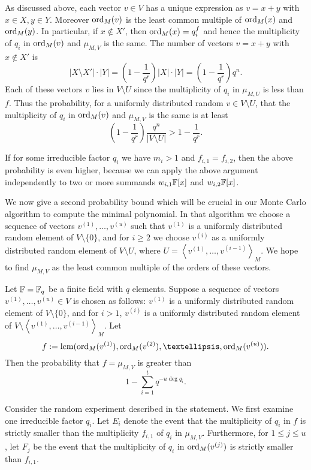 \enlargethispage{2\baselineskip}
As discussed above, each vector $v\in V$ has a 
unique expression as $v=x+y$ with $x\in X, y\in Y$. Moreover
$\mathrm{ord}_M(v)$ is the least common multiple of $\mathrm{ord}_M(x)$ and $\mathrm{ord}_M(y)$.
In particular, if $x\not\in X'$, then $\mathrm{ord}_M(x)=q_i^{f}$ and hence
the multiplicity of $q_i$ in $\mathrm{ord}_M(v)$ and $\mu_{M,V}$ is the same.
The number of vectors $v=x+y$ with $x\not\in X'$ is 
\[
|X\setminus X'|\cdot |Y|=(1-\frac{1}{q^r})|X|\cdot|Y|=(1-\frac{1}{q^r})q^n.
\]
Each of these vectors $v$ lies in $V\setminus U$ since the multiplicity of
$q_i$ in $\mu_{M,U}$ is less than $f$. Thus the probability, for
a uniformly distributed random $v\in V\setminus U$, that the multiplicity 
of $q_i$ in $\mathrm{ord}_M(v)$ and $\mu_{M,V}$ is the same is at least
\[
(1-\frac{1}{q^r})\frac{q^n}{|V\setminus U|} > 1-\frac{1}{q^r}.
\]
\proofend

\begin{Rem}
If for some irreducible factor $q_i$ we have $m_i > 1$
and $f_{i,1} = f_{i,2}$, then the above probability is even higher,
because we can apply the above argument independently to two or more summands
$w_{i,1}\mathbb{F}[x]$ and $w_{i,2}\mathbb{F}[x]$.
\end{Rem}


\smallskip
We now give a second probability bound which will be crucial in our
Monte Carlo algorithm to compute the minimal polynomial. In 
that algorithm we choose  a sequence of vectors 
$v^{(1)}, \dots, v^{(u)}$ such that $v^{(1)}$ is a uniformly distributed
random element of $V\setminus\{0\}$, and for $i\geq2$ we choose
$v^{(i)}$ as a uniformly distributed random element of 
$V \setminus U$, where $U=\left< v^{(1)}, \ldots, v^{(i-1)} \right>_M$.
We hope to find $\mu_{M,V}$ as the least common multiple of the
orders of these vectors.


\begin{Prop}
\label{ProbAllMult}
Let\/ $\mathbb{F} = \mathbb{F}_q$ be a finite field with $q$ elements.
Suppose a sequence of vectors $v^{(1)}, \ldots, v^{(u)} \in V$ is chosen
as follows: $v^{(1)}$ is a uniformly
distributed random element of $V\setminus\{0\}$, and for $i>1$,
$v^{(i)}$ is a  uniformly distributed random element of  
$V \setminus \left< v^{(1)}, \ldots, v^{(i-1)} \right>_M$. 
Let
\[ 
f := \lcm( \ord_M(v^{(1)}), \ord_M(v^{(2)}), \ldots, 
\ord_M(v^{(u)}) ). 
\]
Then the probability that  $f = \mu_{M,V}$  is greater than
\[ 1-\sum_{i=1}^t q^{-u\deg q_i}. \]
\end{Prop}
\proofbeg
Consider the random experiment described in the statement. We first
examine one irreducible factor $q_i$. Let $E_i$ denote the event
that the multiplicity of $q_i$ in $f$ is strictly smaller than 
the multiplicity $f_{i,1}$ of $q_i$ in $\mu_{M,V}$. Furthermore, for
$1 \le j \le u$, let $F_j$  be the event that the multiplicity of $q_i$ in
$\mathrm{ord}_M(v^{(j)})$ is strictly smaller than $f_{i,1}$. 


